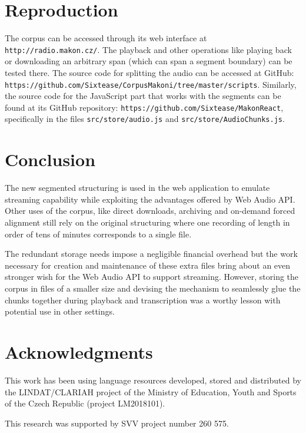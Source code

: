 \documentclass[runningheads]{llncs}
\begin{document}
\section{Reproduction}

The corpus can be accessed through its web interface at
\texttt{http://radio.makon.cz/}. The playback and other operations like playing
back or downloading an arbitrary span (which can span a segment boundary) can be
tested there. The source code for splitting the audio can be accessed at
GitHub: \\
\texttt{https://github.com/Sixtease/CorpusMakoni/tree/master/scripts}.
Similarly, the source code for the JavaScript part that works with the segments
can be found at its GitHub repository:
\texttt{https://github.com/Sixtease/MakonReact}, specifically in the files
\texttt{src/store/audio.js} and \texttt{src/store/AudioChunks.js}.

\section{Conclusion}

The new segmented structuring is used in the web application to emulate streaming capability while exploiting the advantages offered by Web Audio API. Other uses of the corpus, like direct downloads, archiving and on-demand forced alignment still rely on the original structuring where one recording of length in order of tens of minutes corresponds to a single file.

The redundant storage needs impose a negligible financial overhead but the work necessary for creation and maintenance of these extra files bring about an even stronger wish for the Web Audio API to support streaming. However, storing the corpus in files of a smaller size and devising the mechanism to seamlessly glue the chunks together during playback and transcription was a worthy lesson with potential use in other settings.


\section*{Acknowledgments}

This work has been using language resources developed, stored and distributed by
the LINDAT/CLARIAH project of the Ministry of Education, Youth and Sports of the
Czech Republic (project LM2018101).

This research was supported by SVV project number 260 575.




\end{document}
